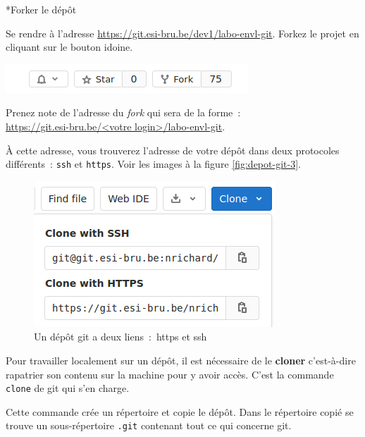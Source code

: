 \documentclass[a4paper,11pt]{style-esi/td}
\begin{document}
\begin{Exercice}*{Forker le dépôt}
	\begin{steps}

	\item Se rendre à l'adresse 
	\url{https://git.esi-bru.be/dev1/labo-envl-git}. Forkez le projet en cliquant
	sur le bouton idoine.
	\begin{center}
	\includegraphics[scale=0.6]{img/depot-git-2.png}
	\end{center}
	
	\item Prenez note de l'adresse du \textit{fork} qui sera de la forme~:\\
	\url{https://git.esi-bru.be/<votre login>/labo-envl-git}.

	À cette adresse, vous trouverez l'adresse de votre dépôt dans deux
	protocoles différents~: \texttt{ssh} et \texttt{https}. Voir les images à la 
	figure \vref{fig:depot-git-3}.

	\begin{figure}[h]
		\centering
		\includegraphics[scale=0.6]{img/depot-git-fork-1.png}
		\caption{Un dépôt git a deux liens : https et ssh}
		\label{fig:depot-git-3}
	\end{figure}

	\end{steps}
\end{Exercice}

Pour travailler localement sur un dépôt, il est nécessaire de le \textbf{cloner}
c'est-à-dire rapatrier son contenu sur la machine pour y avoir accès. 
C'est la commande \texttt{clone} de git qui s'en charge. 

Cette commande crée un répertoire et copie le dépôt. Dans le répertoire copié
se trouve un sous-répertoire \texttt{.git} contenant tout ce qui concerne git. 
\end{document}
